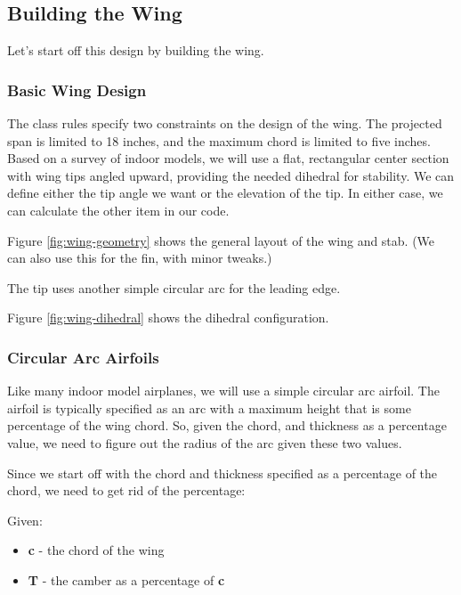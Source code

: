 \subsection{Building the Wing}

Let's start off this design by building the wing.

\subsubsection*{Basic Wing Design}

The class rules specify two constraints on the design of the wing. The projected
span is limited to 18 inches, and the maximum chord is limited to five inches.
Based on a survey of indoor models, we will use a flat, rectangular center section with wing
tips angled upward, providing the needed dihedral for stability. We can define
either the tip angle we want or the elevation of the tip. In either case, we can
calculate the other item in our code.


Figure \ref{fig:wing-geometry} shows the general layout of the wing and stab. (We
can also use this for the fin, with minor tweaks.)


The tip uses another simple circular arc for the leading edge.

Figure \ref{fig:wing-dihedral} shows the dihedral configuration.


\subsubsection{Circular Arc Airfoils}

Like many indoor model airplanes, we will use a simple circular arc airfoil.
The airfoil is typically specified as an arc with a maximum height that is some
percentage of the wing chord.  So, given the chord, and thickness as a
percentage value, we need to figure out the radius of the arc given these two
values.

Since we start off with the chord and thickness specified as a percentage of the
chord, we need to get rid of the percentage:

Given:

\begin{itemize}
  \item{{\bf c} - the chord of the wing}
  \item{{\bf T} - the camber as a percentage of {\bf c}}
\end{itemize}

